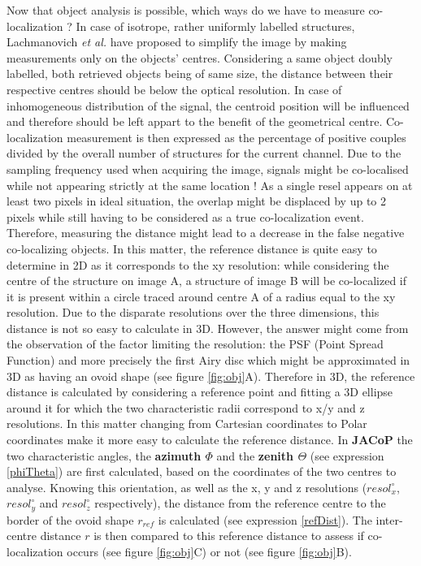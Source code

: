 \documentclass[]{spie}  %
\begin{document}
Now that object analysis is possible, which ways do we have to measure co-localization ? In case of isotrope, rather uniformly labelled structures, Lachmanovich \textit{et al.}\cite{Lachmanovich2003} have proposed to simplify the image by making measurements only on the objects' centres. Considering a same object doubly labelled, both retrieved objects being of same size, the distance between their respective centres should be below the optical resolution. In case of inhomogeneous distribution of the signal, the centroid position will be influenced and therefore should be left appart to the benefit of the geometrical centre. Co-localization measurement is then expressed as the percentage of positive couples divided by the overall number of structures for the current channel. Due to the sampling frequency used when acquiring the image, signals might be co-localised while not appearing strictly at the same location ! As a single resel appears on at least two pixels in ideal situation, the overlap might be displaced by up to 2 pixels while still having to be considered as a true co-localization event. Therefore, measuring the distance might lead to a decrease in the false negative co-localizing objects. In this matter, the reference distance is quite easy to determine in 2D as it corresponds to the xy resolution: while considering the centre of the structure on image A, a structure of image B will be co-localized if it is present within a circle traced around centre A of a radius equal to the xy resolution. Due to the disparate resolutions over the three dimensions, this distance is not so easy to calculate in 3D. However, the answer might come from the observation of the factor limiting the resolution: the PSF (Point Spread Function) and more precisely the first Airy disc which might be approximated in 3D as having an ovoid shape (see figure \ref{fig:obj}A). Therefore in 3D, the reference distance is calculated by considering a reference point and fitting a 3D ellipse around it for which the two characteristic radii correspond to x/y and z resolutions. In this matter changing from Cartesian coordinates to Polar coordinates make it more easy to calculate the reference distance. In \textbf{JACoP} the two characteristic angles, the \textbf{azimuth $\Phi$} and the \textbf{zenith $\Theta$} (see expression \ref{phiTheta}) are first calculated, based on the coordinates of the two centres to analyse. Knowing this orientation, as well as the x, y and z resolutions ($resol^\circ_{x}$, $resol^\circ_{y}$ and $resol^\circ_{z}$ respectively), the distance from the reference centre to the border of the ovoid shape \textbf{$r_{ref}$} is calculated (see expression \ref{refDist}). The inter-centre distance \textbf{$r$} is then compared to this reference distance to assess if co-localization occurs (see figure \ref{fig:obj}C) or not (see figure \ref{fig:obj}B).
\end{document}
